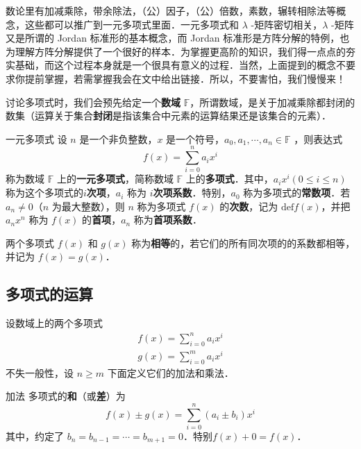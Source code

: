 
数论里有加减乘除，带余除法，（公）因子，（公）倍数，素数，辗转相除法等概念，这些都可以推广到一元多项式里面．一元多项式和 $\lambda$ -矩阵密切相关，$\lambda$ -矩阵又是所谓的 Jordan 标准形的基本概念，而 Jordan 标准形是方阵分解的特例，也为理解方阵分解提供了一个很好的样本．为掌握更高阶的知识，我们得一点点的夯实基础，而这个过程本身就是一个很具有意义的过程．当然，上面提到的概念不要求你提前掌握，若需掌握我会在文中给出链接．所以，不要害怕，我们慢慢来！

讨论多项式时，我们会预先给定一个\textbf{数域} $\mathbb{F}$，所谓数域，是关于加减乘除都封闭的数集（运算关于集合\textbf{封闭}是指该集合中元素的运算结果还是该集合的元素）．
\begin{definition}{一元多项式}
设 $n$ 是一个非负整数，$x$ 是一个符号，$a_0,a_1,\cdots,a_n\in \mathbb{F}$ ，则表达式
\begin{equation}
f(x)=\sum_{i=0}^{n}a_i x^i
\end{equation}
称为数域 $\mathbb{F}$ 上的\textbf{一元多项式}，简称数域 $\mathbb{F}$ 上的\textbf{多项式}．其中，$a_ix^i(0\leq i\leq n)$ 称为这个多项式的\textbf{$i$次项}，$a_i$ 称为 \textbf{$i$次项系数}．特别，$a_0$ 称为多项式的\textbf{常数项}．若 $a_n\neq 0$（$n$ 为最大整数），则 $n$ 称为多项式 $f(x)$ 的\textbf{次数}，记为 $\mathrm{def}f(x)$，并把 $a_nx^n$ 称为 $f(x)$ 的\textbf{首项}，$a_n$ 称为\textbf{首项系数}．
\end{definition}
两个多项式 $f(x)$ 和 $g(x)$ 称为\textbf{相等}的，若它们的所有同次项的的系数都相等，并记为 $f(x)=g(x)$．
\subsection{多项式的运算}
设数域上的两个多项式
\begin{align}
f(x)=\sum_{i=0}^{n}a_ix^i\\
g(x)=\sum_{i=0}^{m}a_ix^i
\end{align}
不失一般性，设 $n\geq m$
下面定义它们的加法和乘法．
\begin{definition}{加法}
多项式的\textbf{和}（或\textbf{差}）为
\begin{equation}
f(x)\pm g(x)=\sum_{i=0}^n (a_i\pm b_i)x^i
\label{OnePol_eq1}
\end{equation}
其中，约定了 $b_n=b_{n-1}=\cdots=b_{m+1}=0$．特别$f(x)+0=f(x)$．
\end{definition}

